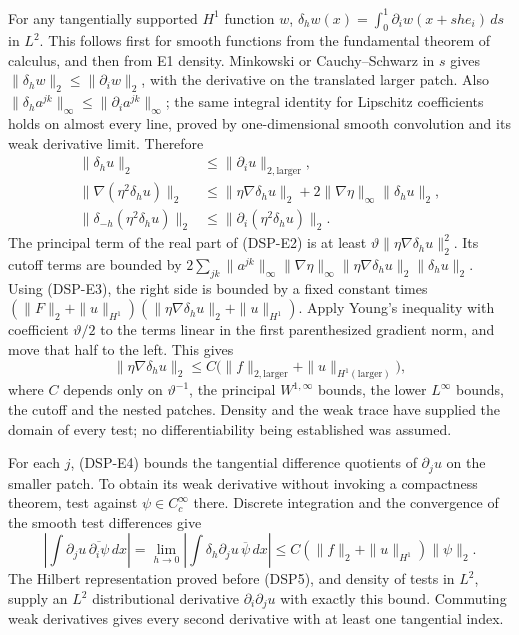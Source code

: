 \documentclass[
  11pt,
]{article}
\begin{document}
For any tangentially supported \(H^1\) function \(w\),
\(\delta_hw(x)=\int_0^1\partial_iw(x+she_i)\,ds\) in \(L^2\). This
follows first for smooth functions from the fundamental theorem of
calculus, and then from E1 density. Minkowski or Cauchy--Schwarz in
\(s\) gives \(\|\delta_hw\|_2\leq\|\partial_iw\|_2\), with the
derivative on the translated larger patch. Also
\(\|\delta_ha^{jk}\|_\infty\leq\|\partial_ia^{jk}\|_\infty\); the same
integral identity for Lipschitz coefficients holds on almost every line,
proved by one-dimensional smooth convolution and its weak derivative
limit. Therefore \[
 \begin{split}
 \|\delta_hu\|_2&\leq\|\partial_iu\|_{2,\mathrm{larger}},\\
 \|\nabla(\eta^2\delta_hu)\|_2
 &\leq\|\eta\nabla\delta_hu\|_2
       +2\|\nabla\eta\|_\infty\|\delta_hu\|_2,\\
 \|\delta_{-h}(\eta^2\delta_hu)\|_2
 &\leq\|\partial_i(\eta^2\delta_hu)\|_2.
 \end{split}\tag{DSP-E3}
\] The principal term of the real part of (DSP-E2) is at least
\(\vartheta\|\eta\nabla\delta_hu\|_2^2\). Its cutoff terms are bounded
by \(2\sum_{jk}\|a^{jk}\|_\infty\|\nabla\eta\|_\infty
 \|\eta\nabla\delta_hu\|_2\|\delta_hu\|_2\). Using (DSP-E3), the right
side is bounded by a fixed constant times \((\|F\|_2+\|u\|_{H^1})
 (\|\eta\nabla\delta_hu\|_2+\|u\|_{H^1})\). Apply Young's inequality
with coefficient \(\vartheta/2\) to the terms linear in the first
parenthesized gradient norm, and move that half to the left. This gives
\[
 \|\eta\nabla\delta_hu\|_2
 \leq C\bigl(\|f\|_{2,\mathrm{larger}}
                 +\|u\|_{H^1(\mathrm{larger})}\bigr),
 \tag{DSP-E4}
\] where \(C\) depends only on \(\vartheta^{-1}\), the principal
\(W^{1,\infty}\) bounds, the lower \(L^\infty\) bounds, the cutoff and
the nested patches. Density and the weak trace have supplied the domain
of every test; no differentiability being established was assumed.

For each \(j\), (DSP-E4) bounds the tangential difference quotients of
\(\partial_ju\) on the smaller patch. To obtain its weak derivative
without invoking a compactness theorem, test against
\(\psi\in C_c^\infty\) there. Discrete integration and the convergence
of the smooth test differences give \[
 \left|\int\partial_ju\,\overline{\partial_i\psi}\,dx\right|
 =\lim_{h\to0}\left|\int\delta_h\partial_ju\,\overline\psi\,dx\right|
 \leq C(\|f\|_2+\|u\|_{H^1})\|\psi\|_2.
 \tag{DSP-E5}
\] The Hilbert representation proved before (DSP5), and density of tests
in \(L^2\), supply an \(L^2\) distributional derivative
\(\partial_i\partial_ju\) with exactly this bound. Commuting weak
derivatives gives every second derivative with at least one tangential
index.
\end{document}
